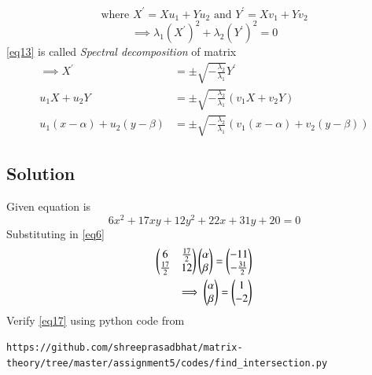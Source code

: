 \documentclass[journal,12pt,twocolumn]{IEEEtran}
\begin{document}
\begin{equation}\label{eq12}
	\text{where } X^\prime = Xu_1 + Yu_2 \text{ and } Y^\prime = Xv_1 + Yv_2
\end{equation}
\begin{equation}\label{eq13}
	\implies \lambda_1 (X^\prime)^2 + \lambda_2 (Y^\prime)^2 = 0
\end{equation}
\eqref{eq13} is called \textit{Spectral decomposition} of matrix
\begin{align}
	\implies X^\prime &= \pm \sqrt{-\frac{\lambda_2}{\lambda_1}}Y^\prime\\	
	u_1X + u_2Y &= \pm \sqrt{-\frac{\lambda_2}{\lambda_1}}(v_1X + v_2Y)\\
	\label{eq14}u_1(x-\alpha) + u_2(y-\beta) &= \pm \sqrt{-\frac{\lambda_2}{\lambda_1}}(v_1(x-\alpha) + v_2(y-\beta))
\end{align}
\subsection{Solution}
Given equation is
\begin{equation}\label{eq15}
	6x^2 + 17xy + 12y^2 + 22x + 31y + 20 = 0
\end{equation}
Substituting in \eqref{eq6}
\begin{align}
	\label{eq16}\begin{pmatrix} 6 & \frac{17}{2}\\\frac{17}{2} & 12\end{pmatrix}\begin{pmatrix}\alpha \\ \beta\end{pmatrix} = \begin{pmatrix}-11 \\ -\frac{31}{2}\end{pmatrix} \\
	\label{eq17}\implies \begin{pmatrix}\alpha \\ \beta\end{pmatrix} = \begin{pmatrix}1 \\ -2\end{pmatrix}
\end{align}
Verify  \eqref{eq17} using python code from
\begin{lstlisting}
https://github.com/shreeprasadbhat/matrix-theory/tree/master/assignment5/codes/find_intersection.py
\end{lstlisting}
\end{document}
